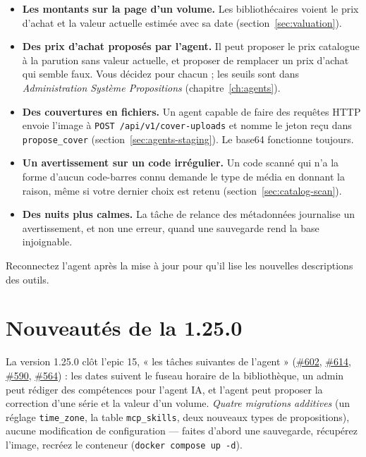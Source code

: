 \begin{itemize}
  \item \textbf{Les montants sur la page d'un volume.} Les bibliothécaires
        voient le prix d'achat et la valeur actuelle estimée avec sa date
        (section~\ref{sec:valuation}).
  \item \textbf{Des prix d'achat proposés par l'agent.} Il peut proposer
        le prix catalogue à la parution sans valeur actuelle, et proposer
        de remplacer un prix d'achat qui semble faux. Vous décidez pour
        chacun ; les seuils sont dans \emph{Administration
        \textrightarrow{} Système \textrightarrow{} Propositions}
        (chapitre~\ref{ch:agents}).
  \item \textbf{Des couvertures en fichiers.} Un agent capable de faire
        des requêtes HTTP envoie l'image à
        \texttt{POST /api/v1/cover-uploads} et nomme le jeton reçu dans
        \texttt{propose\_cover} (section~\ref{sec:agents-staging}). Le
        base64 fonctionne toujours.
  \item \textbf{Un avertissement sur un code irrégulier.} Un code scanné
        qui n'a la forme d'aucun code-barres connu demande le type de média
        en donnant la raison, même si votre dernier choix est retenu
        (section~\ref{sec:catalog-scan}).
  \item \textbf{Des nuits plus calmes.} La tâche de relance des métadonnées
        journalise un avertissement, et non une erreur, quand une sauvegarde
        rend la base injoignable.
\end{itemize}

Reconnectez l'agent après la mise à jour pour qu'il lise les nouvelles
descriptions des outils.

\section{Nouveautés de la 1.25.0}\label{sec:whats-new-1.25.0}

La version 1.25.0 clôt l'epic 15, « les tâches suivantes de l'agent »
(\href{https://github.com/guycorbaz/mybibli/issues/602}{\#602},
\href{https://github.com/guycorbaz/mybibli/issues/614}{\#614},
\href{https://github.com/guycorbaz/mybibli/issues/590}{\#590},
\href{https://github.com/guycorbaz/mybibli/issues/564}{\#564}) : les
dates suivent le fuseau horaire de la bibliothèque, un admin peut
rédiger des compétences pour l'agent IA, et l'agent peut proposer la
correction d'une série et la valeur d'un volume. \emph{Quatre migrations
additives} (un réglage \texttt{time\_zone}, la table
\texttt{mcp\_skills}, deux nouveaux types de propositions), aucune
modification de configuration --- faites d'abord une sauvegarde,
récupérez l'image, recréez le conteneur (\texttt{docker compose up -d}).

